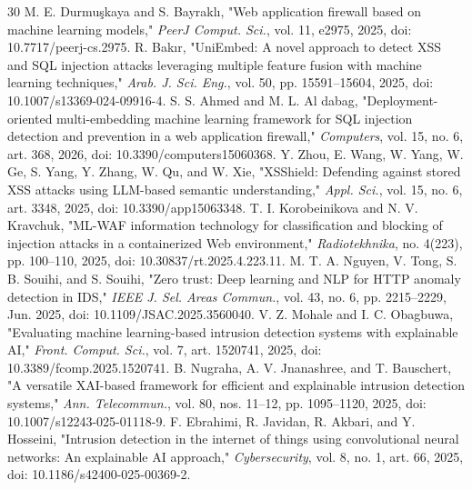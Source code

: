 
\renewcommand{\bibname}{References} %

\begin{small}

\begin{thebibliography}{30}
		M. E. Durmuşkaya and S. Bayraklı, "Web application firewall based on machine learning models," \textit{PeerJ Comput. Sci.}, vol. 11, e2975, 2025, doi: 10.7717/peerj-cs.2975.
		R. Bakır, "UniEmbed: A novel approach to detect XSS and SQL injection attacks leveraging multiple feature fusion with machine learning techniques," \textit{Arab. J. Sci. Eng.}, vol. 50, pp. 15591--15604, 2025, doi: 10.1007/s13369-024-09916-4.
		S. S. Ahmed and M. L. Al dabag, "Deployment-oriented multi-embedding machine learning framework for SQL injection detection and prevention in a web application firewall," \textit{Computers}, vol. 15, no. 6, art. 368, 2026, doi: 10.3390/computers15060368.
		Y. Zhou, E. Wang, W. Yang, W. Ge, S. Yang, Y. Zhang, W. Qu, and W. Xie, "XSShield: Defending against stored XSS attacks using LLM-based semantic understanding," \textit{Appl. Sci.}, vol. 15, no. 6, art. 3348, 2025, doi: 10.3390/app15063348.
		T. I. Korobeinikova and N. V. Kravchuk, "ML-WAF information technology for classification and blocking of injection attacks in a containerized Web environment," \textit{Radiotekhnika}, no. 4(223), pp. 100--110, 2025, doi: 10.30837/rt.2025.4.223.11.
		M. T. A. Nguyen, V. Tong, S. B. Souihi, and S. Souihi, "Zero trust: Deep learning and NLP for HTTP anomaly detection in IDS," \textit{IEEE J. Sel. Areas Commun.}, vol. 43, no. 6, pp. 2215--2229, Jun. 2025, doi: 10.1109/JSAC.2025.3560040.
		V. Z. Mohale and I. C. Obagbuwa, "Evaluating machine learning-based intrusion detection systems with explainable AI," \textit{Front. Comput. Sci.}, vol. 7, art. 1520741, 2025, doi: 10.3389/fcomp.2025.1520741.
		B. Nugraha, A. V. Jnanashree, and T. Bauschert, "A versatile XAI-based framework for efficient and explainable intrusion detection systems," \textit{Ann. Telecommun.}, vol. 80, nos. 11--12, pp. 1095--1120, 2025, doi: 10.1007/s12243-025-01118-9.
		F. Ebrahimi, R. Javidan, R. Akbari, and Y. Hosseini, "Intrusion detection in the internet of things using convolutional neural networks: An explainable AI approach," \textit{Cybersecurity}, vol. 8, no. 1, art. 66, 2025, doi: 10.1186/s42400-025-00369-2.

\end{thebibliography}
\end{small}

